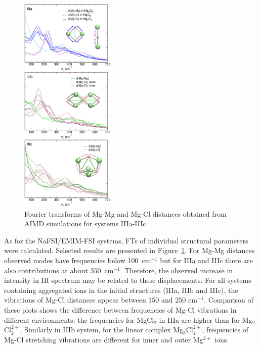 \begin{figure}[ht]
    \centering
    \includegraphics[width=0.4\textwidth]{img/4-ir-spectra-from-aimd-simulations/2-mg-cl-dme/ft-mg-mg.png}
    \caption{Fourier transforms of Mg-Mg and Mg-Cl distances obtained from AIMD simulations for systems IIIa-IIIc}
    \label{fig:mg-cl-dme-ft-mg-mg}
\end{figure}

As for the NaFSI/EMIM-FSI systems, FTs of individual structural parameters were calculated. Selected results are presented in Figure~\ref{fig:mg-cl-dme-ft-mg-mg}. For Mg-Mg distances observed modes have frequencies below 100~cm$^{-1}$ but for IIIa and IIIc there are also contributions at about 350~cm$^{-1}$. Therefore, the observed increase in intensity in IR spectrum may be related to these displacements. For all systems containing aggregated ions in the initial structures (IIIa, IIIb and IIIc), the vibrations of Mg-Cl distances appear between 150 and 250 cm$^{-1}$. Comparison of these plots shows the difference between frequencies of Mg-Cl vibrations in different environments: the frequencies for MgCl$_2$ in IIIa are higher than for Mg$_2$Cl$_2^{2+}$. Similarly in IIIb system, for the linear complex Mg$_3$Cl$_4^{2+}$, frequencies of Mg-Cl stretching vibrations are different for inner and outer Mg$^{2+}$ ions.

